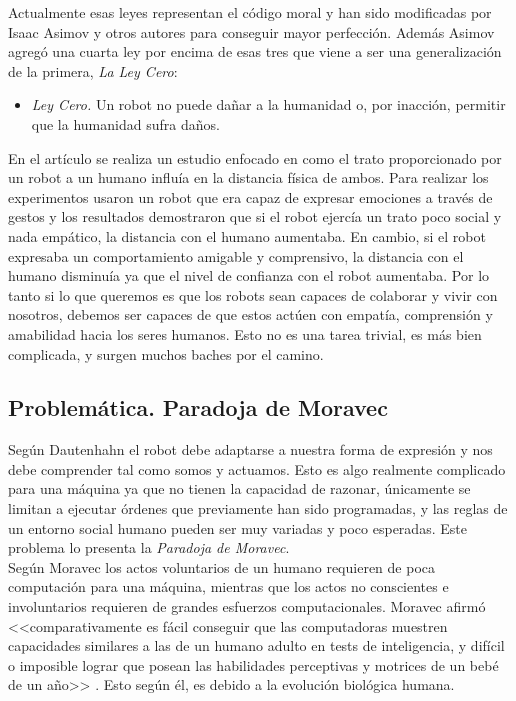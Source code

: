 Actualmente esas leyes representan el código moral y han sido modificadas por Isaac Asimov y otros autores para conseguir mayor perfección. Además Asimov agregó una cuarta ley por encima de esas tres que viene a ser una generalización de la primera, \textit{La Ley Cero}:

\begin{itemize}
    \item \textit{Ley Cero.} Un robot no puede dañar a la humanidad o, por inacción, permitir que la humanidad sufra daños.
\end{itemize}

En el artículo \cite{hri_distancing} se realiza un estudio enfocado en como el trato proporcionado por un robot a un humano influía en la distancia física de ambos. Para realizar los experimentos usaron un robot que era capaz de expresar emociones a través de gestos y los resultados demostraron que si el robot ejercía un trato poco social y nada empático, la distancia con el humano aumentaba. En cambio, si el robot expresaba un comportamiento amigable y comprensivo, la distancia con el humano disminuía ya que el nivel de confianza con el robot aumentaba. Por lo tanto si lo que queremos es que los robots sean capaces de colaborar y vivir con nosotros, debemos ser capaces de que estos actúen con empatía, comprensión y amabilidad hacia los seres humanos. Esto no es una tarea trivial, es más bien complicada, y surgen muchos baches por el camino.

\subsection{Problemática. Paradoja de Moravec}

Según Dautenhahn el robot debe adaptarse a nuestra forma de expresión y nos debe comprender tal como somos y actuamos. Esto es algo realmente complicado para una máquina ya que no tienen la capacidad de razonar, únicamente se limitan a ejecutar órdenes que previamente han sido programadas, y las reglas de un entorno social humano pueden ser muy variadas y poco esperadas. Este problema lo presenta la \textit{Paradoja de Moravec}.\\

Según Moravec los actos voluntarios de un humano requieren de poca computación para una máquina, mientras que los actos no conscientes e involuntarios requieren de grandes esfuerzos computacionales. Moravec afirmó <<comparativamente es fácil conseguir que las computadoras muestren capacidades similares a las de un humano adulto en tests de inteligencia, y difícil o imposible lograr que posean las habilidades perceptivas y motrices de un bebé de un año>> \cite{moravec}. Esto según él, es debido a la evolución biológica humana.\\

